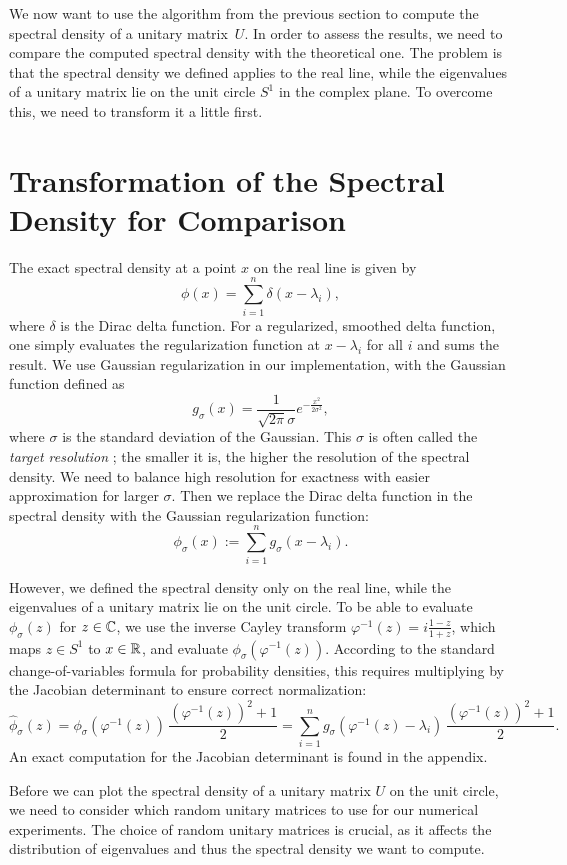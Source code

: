 We now want to use the algorithm from the previous section to compute the spectral density of a unitary matrix~$U$. In order to assess the results, we need to compare the computed spectral density with the theoretical one. The problem is that the spectral density we defined applies to the real line, while the eigenvalues of a unitary matrix lie on the unit circle $S^1$ in the complex plane. To overcome this, we need to transform it a little first.

\section{Transformation of the Spectral Density for Comparison}

The exact spectral density at a point $x$ on the real line is given by
\[
\phi(x) = \sum_{i=1}^n \delta(x - \lambda_i),
\]
where $\delta$ is the Dirac delta function. For a regularized, smoothed delta function, one simply evaluates the regularization function at $x - \lambda_i$ for all $i$ and sums the result. We use Gaussian regularization in our implementation, with the Gaussian function defined as
\[
    g_\sigma(x) = \frac{1}{\sqrt{2\pi} \sigma} e^{-\frac{x^2}{2\sigma^2}},
\]
where $\sigma$ is the standard deviation of the Gaussian. This $\sigma$ is often called the \emph{target resolution} \cite{linsaadyang14}; the smaller it is, the higher the resolution of the spectral density. We need to balance high resolution for exactness with easier approximation for larger $\sigma$.
Then we replace the Dirac delta function in the spectral density with the Gaussian regularization function:
\[
    \phi_\sigma(x) := \sum_{i=1}^n g_\sigma(x - \lambda_i).
\]


However, we defined the spectral density only on the real line, while the eigenvalues of a unitary matrix lie on the unit circle. To be able to evaluate $\phi_\sigma(z)$ for $z \in \mathbb{C}$, we use the inverse Cayley transform $\varphi^{-1}(z) = i\frac{1 - z}{1 + z}$, which maps $z \in S^1$ to $x \in \mathbb{R}$, and evaluate $\phi_\sigma(\varphi^{-1}(z))$. According to the standard change-of-variables formula for probability densities, this requires multiplying by the Jacobian determinant to ensure correct normalization:
\[
    \hat{\phi}_\sigma(z) = \phi_\sigma(\varphi^{-1}(z)) \, \frac{(\varphi^{-1}(z))^2 + 1}{2} = \sum_{i=1}^n g_\sigma(\varphi^{-1}(z) - \lambda_i) \, \frac{(\varphi^{-1}(z))^2 + 1}{2}.
\]
An exact computation for the Jacobian determinant is found in the appendix.

Before we can plot the spectral density of a unitary matrix $U$ on the unit circle, we need to consider which random unitary matrices to use for our numerical experiments. The choice of random unitary matrices is crucial, as it affects the distribution of eigenvalues and thus the spectral density we want to compute.

